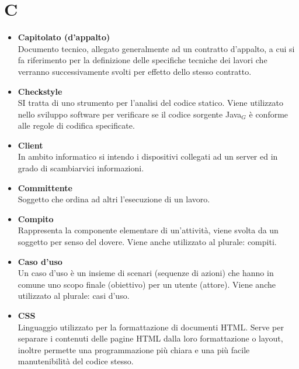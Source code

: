 \chapter{C} \label{C}
\begin{itemize}
	\item \textbf{Capitolato (d'appalto)}\\
	Documento tecnico, allegato generalmente ad un contratto d'appalto, a cui si fa riferimento per la definizione delle specifiche tecniche dei lavori che verranno successivamente svolti per effetto dello stesso contratto.

	\item \textbf{Checkstyle} \\
	SI tratta di uno strumento per l'analisi del codice statico.
	Viene utilizzato nello sviluppo software per verificare se il codice sorgente Java$_G$ è conforme alle regole di codifica specificate.

	\item \textbf{Client} \\
	In ambito informatico si intendo i dispositivi collegati ad un server ed in grado di scambiarvici informazioni.

	\item \textbf{Committente}\\
	Soggetto che ordina ad altri l'esecuzione di un lavoro.

	\item \textbf{Compito}\\
	Rappresenta la componente elementare di un'attività, viene svolta da un soggetto per senso del dovere.
	Viene anche utilizzato al plurale: compiti.

	\item \textbf{Caso d'uso}\\
	Un caso d’uso è un insieme di scenari (sequenze di azioni) che hanno in comune uno scopo finale (obiettivo) per un utente (attore).
	Viene anche utilizzato al plurale: casi d'uso.

	\item \textbf{CSS} \\
	Linguaggio utilizzato per la formattazione di documenti HTML.
	Serve per separare i contenuti delle pagine HTML dalla loro formattazione o layout, inoltre permette una programmazione più chiara e una più facile manutenibilità del codice stesso.
\end{itemize}
